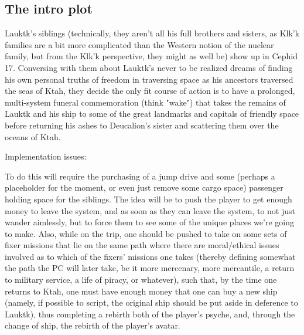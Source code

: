 \subsection{The intro plot}

Lauktk's siblings (technically, they aren't all his full brothers and
sisters, as Klk'k families are a bit more complicated than the Western
notion of the nuclear family, but from the Klk'k perspective, they
might as well be) show up in Cephid 17.  Conversing with them about
Lauktk's never to be realized dreams of finding his own personal
truths of freedom in traversing space as his ancestors traversed the
seas of Ktah, they decide the only fit course of action is to have a
prolonged, multi-system funeral commemoration (think "wake") that
takes the remains of Lauktk and his ship to some of the great
landmarks and capitals of friendly space before returning his ashes to
Deucalion's sister and scattering them over the oceans of Ktah.

Implementation issues:

To do this will require the purchasing of a jump drive and some
(perhaps a placeholder for the moment, or even just remove some cargo
space) passenger holding space for the siblings.  The idea will be to
push the player to get enough money to leave the system, and as soon
as they can leave the system, to not just wander aimlessly, but to
force them to see some of the unique places we're going to make. Also,
while on the trip, one should be pushed to take on some sets of fixer
missions that lie on the same path where there are moral/ethical
issues involved as to which of the fixers' missions one takes (thereby
defining somewhat the path the PC will later take, be it more
mercenary, more mercantile, a return to military service, a life of
piracy, or whatever), such that, by the time one returns to Ktah, one
must have enough money that one can buy a new ship (namely, if
possible to script, the original ship should be put aside in deference
to Lauktk), thus completing a rebirth both of the player's psyche,
and, through the change of ship, the rebirth of the player's avatar.

